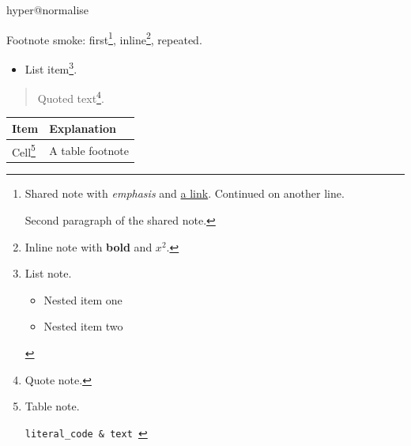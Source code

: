 \ifcsname hyper@normalise\endcsname\else\PackageError{mark2tex}{Markdown links require hyperref}{Load \string\usepackage{hyperref} in the document preamble.}\fi
\begin{frame}[t]
Footnote smoke: first\footnote{\label{mark2tex:footnote:9a73ec147020e5f3f162908b134a7721:1}Shared note with \emph{emphasis} and \href{\detokenize{https://example.org/footnote}}{a link}.
Continued on another line.

Second paragraph of the shared note.}, inline\footnote{Inline note with \textbf{bold} and $x^2$.}, repeated.

\begin{itemize}
\item List item\footnote{\label{mark2tex:footnote:9a73ec147020e5f3f162908b134a7721:2}List note.

\begin{itemize}
\item Nested item one
\item Nested item two
\end{itemize}}.
\end{itemize}

\begin{quote}
Quoted text\footnote{Quote note.}.
\end{quote}

\par\addvspace{\medskipamount}
\noindent\begin{tabularx}{\linewidth}{@{}>{\raggedright\arraybackslash}X>{\raggedright\arraybackslash}X@{}}
\toprule
Item & Explanation \\
\midrule
Cell\footnote{\label{mark2tex:footnote:9a73ec147020e5f3f162908b134a7721:3}Table note.

\texttt{literal\_code \& text
}} & A table footnote \\
\bottomrule
\end{tabularx}
\par\addvspace{\medskipamount}




\end{frame}


